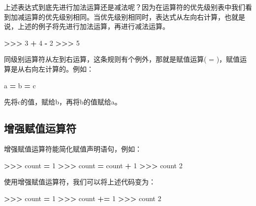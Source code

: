 \documentclass[]{ctexbook}
\newenvironment{Shaded}{\begin{snugshade}}{\end{snugshade}}
\newcommand{\DecValTok}[1]{\textcolor[rgb]{0.00,0.00,0.81}{#1}}
\newcommand{\NormalTok}[1]{#1}
\newcommand{\OperatorTok}[1]{\textcolor[rgb]{0.81,0.36,0.00}{\textbf{#1}}}
\begin{document}
上述表达式到底先进行加法运算还是减法呢？因为在运算符的优先级别表中我们看到加减运算的优先级别相同。当优先级别相同时，表达式从左向右计算，也就是说，上述的例子将先进行加法运算，再进行减法运算。

\begin{Shaded}
\begin{Highlighting}[]
\OperatorTok{>>>} \DecValTok{3} \OperatorTok{+} \DecValTok{4} \OperatorTok{-} \DecValTok{2}
\OperatorTok{>>>} \DecValTok{5}
\end{Highlighting}
\end{Shaded}

同级别运算符从左到右运算，这条规则有个例外，那就是赋值运算( = )，赋值运算是从右向左计算的。例如：

\begin{Shaded}
\begin{Highlighting}[]
\NormalTok{a }\OperatorTok{=}\NormalTok{ b }\OperatorTok{=}\NormalTok{ c}
\end{Highlighting}
\end{Shaded}

先将c的值，赋给b，再将b的值赋给a。

\hypertarget{ux589eux5f3aux8d4bux503cux8fd0ux7b97ux7b26}{%
\subsection{增强赋值运算符}\label{ux589eux5f3aux8d4bux503cux8fd0ux7b97ux7b26}}

增强赋值运算符能简化赋值声明语句，例如：

\begin{Shaded}
\begin{Highlighting}[]
\OperatorTok{>>>}\NormalTok{ count }\OperatorTok{=} \DecValTok{1}
\OperatorTok{>>>}\NormalTok{ count }\OperatorTok{=}\NormalTok{ count }\OperatorTok{+} \DecValTok{1}
\OperatorTok{>>>}\NormalTok{ count}
\DecValTok{2}
\end{Highlighting}
\end{Shaded}

使用增强赋值运算符，我们可以将上述代码变为：

\begin{Shaded}
\begin{Highlighting}[]
\OperatorTok{>>>}\NormalTok{ count }\OperatorTok{=} \DecValTok{1}
\OperatorTok{>>>}\NormalTok{ count }\OperatorTok{+=} \DecValTok{1}
\OperatorTok{>>>}\NormalTok{ count}
\DecValTok{2}
\end{Highlighting}
\end{Shaded}
\end{document}
